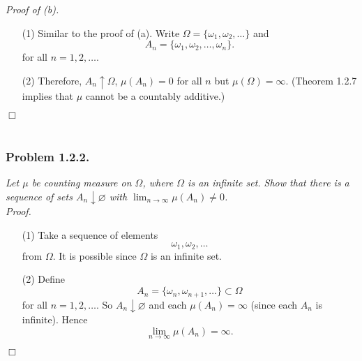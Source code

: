 \documentclass{article}
\begin{document}
\emph{Proof of (b).}
\begin{enumerate}
\item[(1)]
  Similar to the proof of (a).
  Write $\Omega = \{ \omega_1, \omega_2, \ldots \}$ and
  \[
    A_n = \{ \omega_1, \omega_2, \ldots, \omega_n \}.
  \]
  for all $n = 1, 2, \ldots$.

\item[(2)]
  Therefore, $A_n \uparrow \Omega$, $\mu(A_n) = 0$ for all $n$ but $\mu(\Omega) = \infty$.
  (Theorem 1.2.7 implies that $\mu$ cannot be a countably additive.)
\end{enumerate}
$\Box$ \\\\






\subsubsection*{Problem 1.2.2.}
\emph{Let $\mu$ be counting measure on $\Omega$,
where $\Omega$ is an infinite set.
Show that there is a sequence of sets $A_n \downarrow \varnothing$ with
$\lim_{n \to \infty} \mu(A_n) \neq 0$.} \\



\emph{Proof.}
\begin{enumerate}
\item[(1)]
  Take a sequence of elements
  \[
    \omega_1, \omega_2, \ldots
  \]
  from $\Omega$.
  It is possible since $\Omega$ is an infinite set.

\item[(2)]
  Define
  \[
    A_n = \{ \omega_n, \omega_{n+1}, \ldots \} \subset \Omega
  \]
  for all $n = 1, 2, \ldots$.
  So $A_n \downarrow \varnothing$ and each $\mu(A_n) = \infty$
  (since each $A_n$ is infinite).
  Hence
  \[
    \lim_{n \to \infty} \mu(A_n) = \infty.
  \]
\end{enumerate}
$\Box$ \\\\



\end{document}
